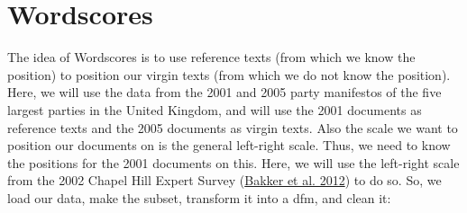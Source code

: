 \documentclass[
]{book}
\begin{document}
\hypertarget{wordscores}{%
\section{Wordscores}\label{wordscores}}

The idea of Wordscores is to use reference texts (from which we know the position) to position our virgin texts (from which we do not know the position). Here, we will use the data from the 2001 and 2005 party manifestos of the five largest parties in the United Kingdom, and will use the 2001 documents as reference texts and the 2005 documents as virgin texts. Also the scale we want to position our documents on is the general left-right scale. Thus, we need to know the positions for the 2001 documents on this. Here, we will use the left-right scale from the 2002 Chapel Hill Expert Survey (\protect\hyperlink{ref-Bakker2012a}{Bakker et al. 2012}) to do so. So, we load our data, make the subset, transform it into a dfm, and clean it:
\end{document}
